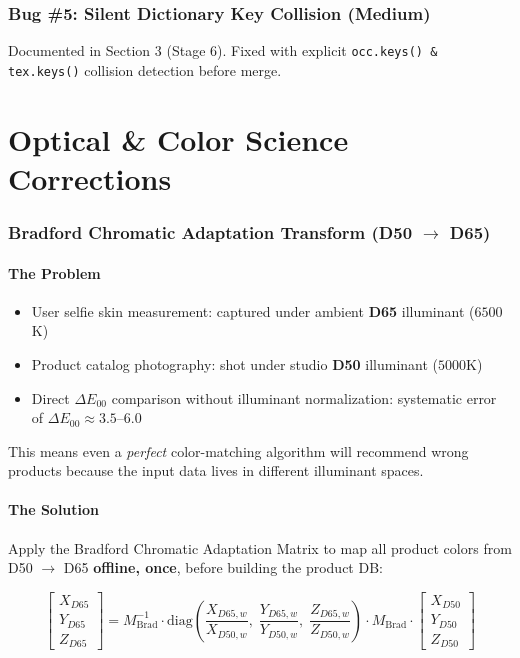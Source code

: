 \documentclass[12pt,a4paper]{article}
\begin{document}
\section{Bug \#5: Silent Dictionary Key Collision (Medium)}

Documented in Section 3 (Stage 6). Fixed with explicit \texttt{occ.keys() \& tex.keys()} collision detection before merge.


\part{Optical \& Color Science Corrections}

\section{Bradford Chromatic Adaptation Transform (D50 $\to$ D65)}
\label{sec:bradford}

\subsection{The Problem}
\begin{itemize}
    \item User selfie skin measurement: captured under ambient \textbf{D65} illuminant ($6500$K)
    \item Product catalog photography: shot under studio \textbf{D50} illuminant ($5000$K)
    \item Direct $\Delta E_{00}$ comparison without illuminant normalization: systematic error of $\Delta E_{00} \approx 3.5$--$6.0$
\end{itemize}

This means even a \textit{perfect} color-matching algorithm will recommend wrong products because the input data lives in different illuminant spaces.

\subsection{The Solution}
Apply the Bradford Chromatic Adaptation Matrix to map all product colors from D50 $\to$ D65 \textbf{offline, once}, before building the product DB:

\begin{equation}
\begin{bmatrix} X_{D65} \\ Y_{D65} \\ Z_{D65} \end{bmatrix} =
M_{\text{Brad}}^{-1} \cdot
\text{diag}\!\left(\frac{X_{D65,w}}{X_{D50,w}},\; \frac{Y_{D65,w}}{Y_{D50,w}},\; \frac{Z_{D65,w}}{Z_{D50,w}}\right) \cdot
M_{\text{Brad}} \cdot
\begin{bmatrix} X_{D50} \\ Y_{D50} \\ Z_{D50} \end{bmatrix}
\end{equation}
\end{document}
